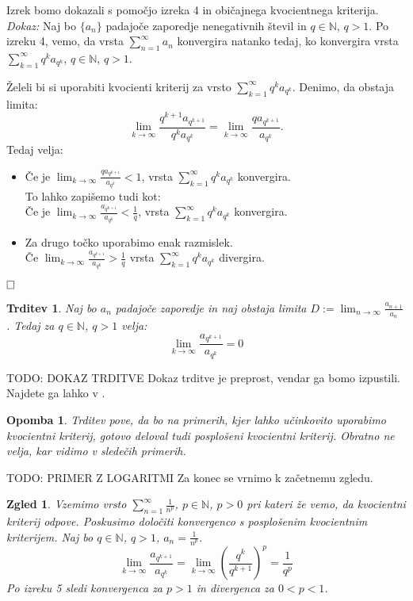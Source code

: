 \documentclass[a4paper,12pt]{article}
\def\N{\mathbb{N}} %
\def\qed{$\hfill\Box$}   %
\newtheorem{trditev}{Trditev}
\newtheorem{opomba}{Opomba}
\newtheorem{zgled}{Zgled}
\begin{document}
\noindent
Izrek bomo dokazali s pomočjo izreka 4 in običajnega kvocientnega kriterija.\\
\noindent
{\em Dokaz:\/} Naj bo $\{a_n\}$ padajoče zaporedje nenegativnih števil in $ q \in {\mathbb{N}}$, $q > 1$.
Po izreku 4, vemo, da vrsta $\sum_{n = 1}^{\infty}{a_n}$ konvergira natanko tedaj, ko konvergira vrsta
$\sum_{k = 1}^{\infty}{q^ka_{q^k}}$, $q \in {\mathbb{N}}$, $q > 1$.

Želeli bi si uporabiti kvocienti kriterij za vrsto $\sum_{k = 1}^{\infty}{q^ka_{q^k}}$.
Denimo, da obstaja limita:
\[ 
    \lim_{k \to \infty}{\frac{q^{k + 1}a_{q^{k + 1}}}{q^ka_{q^k}}}  =
    \lim_{k \to \infty}{\frac{qa_{q^{k + 1}}}{a_{q^k}}}  
    \text{.}
\]
Tedaj velja:
\begin{itemize}
    \item Če je $\lim_{k \to \infty}{\frac{qa_{q^{k + 1}}}{a_{q^k}}} < 1$, vrsta $\sum_{k = 1}^{\infty}{q^ka_{q^k}}$ konvergira.\\
    To lahko zapišemo tudi kot:\\
    Če je $\lim_{k \to \infty}{\frac{a_{q^{k + 1}}}{a_{q^k}}} < \frac{1}{q}$, vrsta $\sum_{k = 1}^{\infty}{q^ka_{q^k}}$ konvergira.
    \item Za drugo točko uporabimo enak razmislek.\\
    Če $\lim_{k \to \infty}{\frac{a_{q^{k + 1}}}{a_{q^k}}} > \frac{1}{q}$
    vrsta $\sum_{k = 1}^{\infty}{q^ka_{q^k}}$ divergira. 
\end{itemize}
\qed


\begin{trditev}
    Naj bo $a_{n}$ padajoče zaporedje in naj obstaja limita
    $D := \lim_{n \to \infty}{\frac{a_{n + 1}}{a_n}}$. Tedaj za $q \in {\mathbb{N}}$, $q > 1$ velja:
    \[
        \lim_{k \to \infty}{\frac{a_{q^{k + 1}}}{a_{q^k}}} = 0
    \]
\end{trditev}

TODO: DOKAZ TRDITVE
Dokaz trditve je preprost, vendar ga bomo izpustili. Najdete ga lahko v \cite{convergence}.

\begin{opomba}
    Trditev pove, da bo na primerih, kjer lahko učinkovito uporabimo kvocientni kriterij,
    gotovo deloval tudi posplošeni kvocientni kriterij. Obratno ne velja, kar vidimo v sledečih primerih.
\end{opomba}

TODO: PRIMER Z LOGARITMI
\noindent
Za konec se vrnimo k začetnemu zgledu.
\begin{zgled}
    Vzemimo vrsto $\sum_{n = 1}^{\infty}{\frac{1}{n^p}}$, $p \in \N$, $p > 0$ pri kateri
    že vemo, da kvocientni kriterij odpove. Poskusimo določiti konvergenco s posplošenim kvocientnim kriterijem.
    Naj bo $q \in \N$, $q > 1$, $a_n = \frac{1}{n^p}$.
    \[
            \lim_{k \to \infty}{\frac{a_{q^{k + 1}}}{a_{q^k}}} =
            \lim_{k \to \infty}{(\frac{q^k}{q^{k+1}})^p} = \frac{1}{q^p}
    \]
    Po izreku 5 sledi konvergenca za $p>1$ in divergenca za $ 0< p<1$.
\end{zgled}
\end{document}
